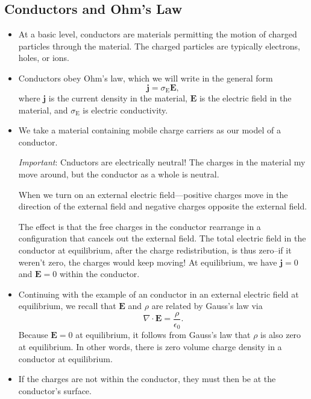 \documentclass[11pt, a4paper]{article}
\renewcommand{\vec}[1]{\bm{#1}} %
\newcommand{\E}{\vec{E}} %
\newcommand{\ee}{\epsilon_{0}}  %
\renewcommand{\j}{\vec{j}}  %
\renewcommand{\div}{\nabla \cdot}
\begin{document}
\subsection{Conductors and Ohm's Law}
\begin{itemize}
	\item At a basic level, conductors are materials permitting the motion of charged particles through the material. The charged particles are typically electrons, holes, or ions.
	
	\item Conductors obey Ohm's law, which we will write in the general form
	\begin{equation*}
		\j = \sigma_{\mathrm{E}} \E,
	\end{equation*}
	where $ \j $ is the current density in the material, $ \E $ is the electric field in the material, and $ \sigma_{\mathrm{E}} $ is electric conductivity.
	
	\item We take a material containing mobile charge carriers as our model of a conductor. 

    \textit{Important}: Cnductors are electrically neutral! The charges in the material my move around, but the conductor as a whole is neutral.
	
	When we turn on an external electric field---positive charges move in the direction of the external field and negative charges opposite the external field. 
	
	The effect is that the free charges in the conductor rearrange in a configuration that cancels out the external field. The total electric field in the conductor at equilibrium, after the charge redistribution, is thus zero--if it weren't zero, the charges would keep moving! At equilibrium, we have $ \j = 0 $ and $ \E = 0 $ within the conductor.
	
	\item Continuing with the example of an conductor in an external electric field at equilibrium, we recall that $ \E $ and $ \rho $ are related by Gauss's law via
	\begin{equation*}
		\div \E = \frac{\rho}{\ee}.
	\end{equation*}
	Because $ \E = 0 $ at equilibrium, it follows from Gauss's law that $ \rho $ is also zero at equilibrium. In other words, there is zero volume charge density in a conductor at equilibrium.
	
	\item If the charges are not within the conductor, they must then be at the conductor's surface. 


\end{itemize}
\end{document}
